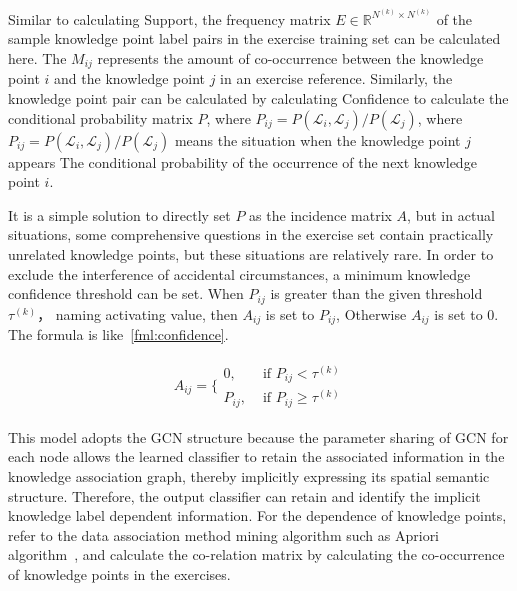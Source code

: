 Similar to calculating Support, the frequency matrix \(E\in \mathbb{R}^{N^{(k)}\times N^{(k)}}\) of the sample knowledge point label pairs in the exercise training set can be calculated here. The \(M_{ij}\) represents the amount of co-occurrence between the knowledge point \(i\) and the knowledge point \(j\) in an exercise reference. Similarly, the knowledge point pair can be calculated by calculating Confidence to calculate the conditional probability matrix \(P\), where \(P_{ij}=P(\mathcal{L}_i, \mathcal{L}_j)/P(\mathcal{L}_j)\), where \(P_{ij}=P(\mathcal{L}_i, \mathcal{L}_j)/P(\mathcal{L}_j)\) means the situation when the knowledge point \(j\) appears The conditional probability of the occurrence of the next knowledge point \(i\).

It is a simple solution to directly set \(P\) as the incidence matrix \(A\), but in actual situations, some comprehensive questions in the exercise set contain practically unrelated knowledge points, but these situations are relatively rare. In order to exclude the interference of accidental circumstances, a minimum knowledge confidence threshold can be set. When \(P_{ij}\) is greater than the given threshold \(\tau^{(k)} \)， naming activating value, then \(A_{ij}\) is set to \(P_{ij}\), Otherwise \(A_{ij}\) is set to 0. The formula is like~\ref{fml:confidence}.

\begin{align}
	A_{ij}=\{\begin{array}{ll}
		0,      & \text{ if } P_{ij}<\tau^{(k)}      \\
		P_{ij}, & \text{ if } P_{ij} \geq \tau^{(k)}
	\end{array}\label{fml:confidence}
\end{align}



This model adopts the GCN structure because the parameter sharing of GCN for each node allows the learned classifier to retain the associated information in the knowledge association graph, thereby implicitly expressing its spatial semantic structure. Therefore, the output classifier can retain and identify the implicit knowledge label dependent information. For the dependence of knowledge points, refer to the data association method mining algorithm such as Apriori algorithm~\cite{panjaitan2019implementation}, and calculate the co-relation matrix by calculating the co-occurrence of knowledge points in the exercises.


